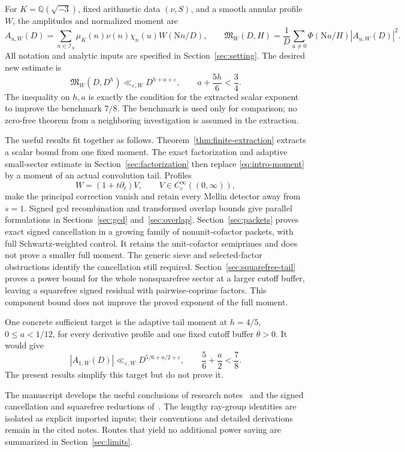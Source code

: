 \documentclass[11pt]{article}
\numberwithin{equation}{section}
\theoremstyle{definition}
\theoremstyle{remark}
\newcommand{\N}{\mathrm N}
\newcommand{\muK}{\mu_K}
\newcommand{\Mfrak}{\mathfrak M}
\newcommand{\eps}{\varepsilon}
\newcommand{\Q}{\mathbb Q}
\newcommand{\good}{\mathcal I_S}
\begin{document}
For \(K=\Q(\sqrt{-3})\), fixed arithmetic data \((\nu,S)\), and a smooth
annular profile \(W\), the amplitudes and normalized moment are
\[
 A_{u,W}(D)=\sum_{n\in\good}\muK(n)\nu(n)\chi_n(u)W(\N n/D),
 \qquad
 \Mfrak_W(D,H)=\frac1D\sum_{u\ne0}
       \Phi(\N u/H)|A_{u,W}(D)|^2.
\]
All notation and analytic inputs are specified in
Section~\ref{sec:setting}. The desired new estimate is
\begin{equation}\label{eq:intro-moment}
 \Mfrak_W(D,D^h)\ll_{\eps,W}D^{h+a+\eps},
 \qquad a+\frac{5h}{6}<\frac34.
\end{equation}
The inequality on \(h,a\) is exactly the condition for the extracted
scalar exponent to improve the benchmark \(7/8\).
The benchmark is used only for comparison; no zero-free theorem
from a neighboring investigation is assumed in the extraction.

The useful results fit together as follows.
Theorem~\ref{thm:finite-extraction} extracts a scalar bound from one fixed
moment. The exact factorization and adaptive small-sector estimate
in Section~\ref{sec:factorization} then replace
\eqref{eq:intro-moment} by a moment of an actual convolution tail.
Profiles
\[
 W=(1+t\partial_t)V,\qquad V\in C_c^\infty((0,\infty)),
\]
make the principal correction vanish and retain every Mellin detector
away from \(s=1\). Signed gcd recombination and transformed overlap
bounds give parallel formulations in
Sections~\ref{sec:gcd} and~\ref{sec:overlap}.
Section~\ref{sec:packets} proves exact signed cancellation in a growing
family of nonunit-cofactor packets, with full Schwartz-weighted control.
It retains the unit-cofactor semiprimes and does not prove a smaller full
moment. The generic sieve and selected-factor obstructions identify the
cancellation still required.
Section~\ref{sec:squarefree-tail} proves a power bound for the whole
nonsquarefree sector at a larger cutoff buffer, leaving a squarefree
signed residual with pairwise-coprime factors. This component bound
does not improve the proved exponent of the full moment.

One concrete sufficient target is the adaptive tail moment at
\(h=4/5\), \(0\le a<1/12\), for every derivative profile and one
fixed cutoff buffer \(\theta>0\). It would give
\[
 |A_{1,W}(D)|\ll_{\eps,W}D^{5/6+a/2+\eps},
 \qquad \frac56+\frac a2<\frac78.
\]
The present results simplify this target but do not prove it.

The manuscript develops the useful conclusions of research
notes~\cite{N1,N2,N3,N4,N5,N6,N7,N8,N9,N10,N11,N12,N13}
and the signed cancellation and squarefree reductions of~\cite{N15,N17}.
The lengthy ray-group identities are isolated as explicit imported
inputs; their conventions and detailed derivations remain in the
cited notes. Routes that yield no additional power saving are
summarized in Section~\ref{sec:limits}.
\end{document}
